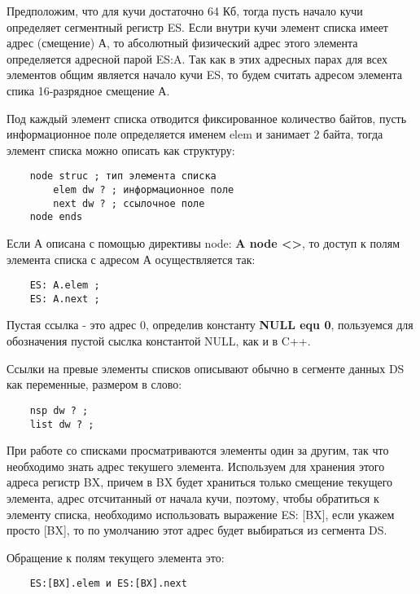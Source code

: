 Предположим, что для кучи достаточно 64 Кб, тогда пусть начало кучи определяет сегментный регистр ES. Если внутри кучи элемент списка имеет адрес (смещение) А, то абсолютный физический адрес этого элемента определяется адресной парой ES:A.
Так как в этих адресных парах для всех элементов общим является начало кучи ES, то будем считать адресом элемента спика 16-разрядное смещение А.

Под каждый элемент списка отводится фиксированное количество байтов, пусть информационное поле определяется именем elem и занимает 2 байта, тогда элемент списка можно описать как структуру:
\begin{verbatim}
    node struc ; тип элемента списка
        elem dw ? ; информационное поле
        next dw ? ; ссылочное поле
    node ends
\end{verbatim}

Если А описана с помощью директивы node: \textbf{A node <>}, то доступ к полям элемента списка с адресом А осуществляется так:
\begin{verbatim}
    ES: A.elem ;
    ES: A.next ;
\end{verbatim}

Пустая ссылка - это адрес 0, определив константу \textbf{NULL equ 0}, 
пользуемся для обозначения пустой сыслка константой NULL, как и в C++.

Ссылки на превые элементы списков описывают обычно в сегменте данных DS как переменные, размером в слово:
\begin{verbatim}
    nsp dw ? ;
    list dw ? ;
\end{verbatim}

При работе со списками просматриваются элементы один за другим, так что необходимо знать адрес текушего элемента. Используем для хранения этого адреса регистр BX, причем в BX будет храниться только смещение текущего элемента,
адрес отсчитанный от начала кучи, поэтому, чтобы обратиться к элементу списка, необходимо использовать выражение ES: [BX], если укажем просто [BX], то по умолчанию этот адрес будет выбираться из сегмента DS.

Обращение к полям текущего элемента это:
\begin{verbatim}
    ES:[BX].elem и ES:[BX].next
\end{verbatim}

